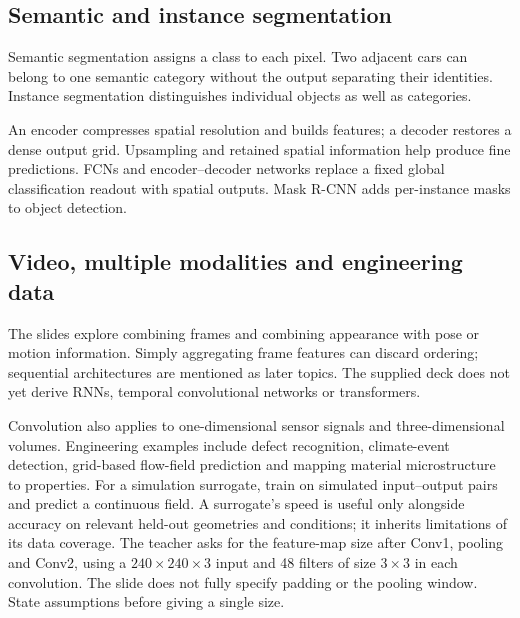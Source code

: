 \documentclass[11pt]{article}
\begin{document}
\subsection{Semantic and instance segmentation}
Semantic segmentation assigns a class to each pixel. Two adjacent cars can belong to one semantic category without the output separating their identities. Instance segmentation distinguishes individual objects as well as categories.

An encoder compresses spatial resolution and builds features; a decoder restores a dense output grid. Upsampling and retained spatial information help produce fine predictions. FCNs and encoder--decoder networks replace a fixed global classification readout with spatial outputs. Mask R-CNN adds per-instance masks to object detection.
\subsection{Video, multiple modalities and engineering data}
The slides explore combining frames and combining appearance with pose or motion information. Simply aggregating frame features can discard ordering; sequential architectures are mentioned as later topics. The supplied deck does not yet derive RNNs, temporal convolutional networks or transformers.

Convolution also applies to one-dimensional sensor signals and three-dimensional volumes. Engineering examples include defect recognition, climate-event detection, grid-based flow-field prediction and mapping material microstructure to properties. For a simulation surrogate, train on simulated input--output pairs and predict a continuous field. A surrogate's speed is useful only alongside accuracy on relevant held-out geometries and conditions; it inherits limitations of its data coverage.
The teacher asks for the feature-map size after Conv1, pooling and Conv2, using a $240\times240\times3$ input and 48 filters of size $3\times3$ in each convolution. The slide does not fully specify padding or the pooling window. State assumptions before giving a single size.
\end{document}
